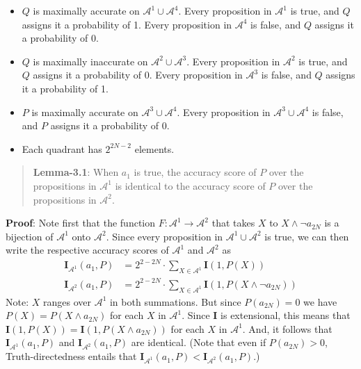 \begin{itemize}
\item $Q$ is maximally accurate on $\mathscr{A}^1 \cup \mathscr{A}^4$. Every proposition in $\mathscr{A}^1$ is true, and $Q$ assigns it a probability of 1. Every proposition in $\mathscr{A}^4$ is false, and $Q$ assigns it a probability of 0.

\item $Q$ is maximally inaccurate on $\mathscr{A}^2 \cup \mathscr{A}^3$. Every proposition in $\mathscr{A}^2$ is true, and $Q$ assigns it a probability of 0. Every proposition in $\mathscr{A}^3$ is false, and $Q$ assigns it a probability of 1.

\item $P$ is maximally accurate on $\mathscr{A}^3 \cup \mathscr{A}^4$. Every proposition in $\mathscr{A}^3 \cup \mathscr{A}^4$ is false, and $P$ assigns it a probability of 0.

\item Each quadrant has $2^{2N-2}$ elements.

\end{itemize}
\begin{quote}

\textbf{Lemma-3.1}: When $a_1$ is true, the accuracy score of $P$ over the propositions in $\mathscr{A}^1$ is identical to the accuracy score of $P$ over the propositions in $\mathscr{A}^2$.
\end{quote}
\textbf{Proof}: Note first that the function $F: \mathscr{A}^1 \rightarrow \mathscr{A}^2$ that takes $X$ to $X \wedge \neg a_{2N}$ is a bijection of $\mathscr{A}^1$ onto $\mathscr{A}^2$. Since every proposition in $\mathscr{A}^1 \cup \mathscr{A}^2$ is true, we can then write the respective accuracy scores of $\mathscr{A}^1$ and  $\mathscr{A}^2$ as 
\begin{align*}
\mathbf{I}_{\mathscr{A}^1}(a_1, P) &= 2^{2-2N} \cdot \sum_{X \in \mathscr{A}^1} \mathbf{I}(1, P(X)) \\
\mathbf{I}_{\mathscr{A}^2}(a_1, P) &= 2^{2-2N} \cdot \sum_{X \in \mathscr{A}^1} \mathbf{I}(1, P(X \wedge \neg a_{2N}))
\end{align*}
Note: $X$ ranges over $\mathscr{A}^1$ in both summations. But since $P(a_{2N}) = 0$ we have $P(X) = P(X \wedge a_{2N})$ for each $X$ in $\mathscr{A}^1$. Since \textbf{I} is extensional, this means that $\mathbf{I}(1, P(X)) = \mathbf{I}(1, P(X \wedge a_{2N}))$ for each $X$ in $\mathscr{A}^1$. And, it follows that $\mathbf{I}_{\mathscr{A}^1}(a_1, P)$ and $\mathbf{I}_{\mathscr{A}^2}(a_1, P)$ are identical. (Note that even if $P(a_{2N}) > 0$, Truth-directedness entails that $\mathbf{I}_{\mathscr{A}^1}(a_1, P) < \mathbf{I}_{\mathscr{A}^2}(a_1, P)$.)

